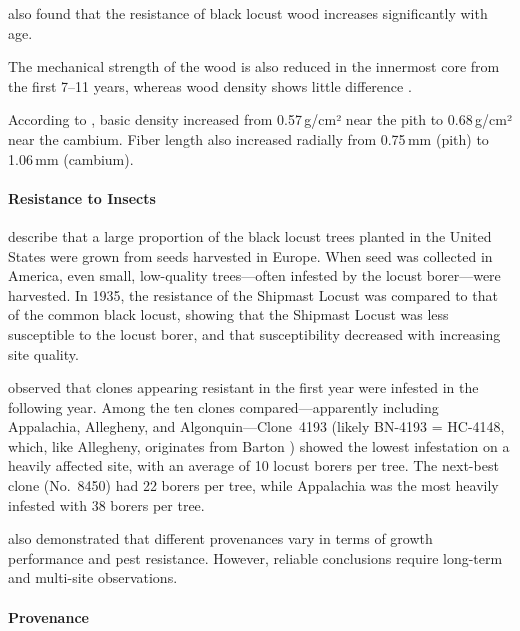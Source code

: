 \citet{szczepkowski2025robinePilze} also found that the resistance of black locust wood increases significantly with age.

The mechanical strength of the wood is also reduced in the innermost core from the first 7–11 years, whereas wood density shows little difference \citep{adamopoulos2007jungesUndAltesRobinienholz,bijak2021robinienholz}.

According to \citet{stringer1987robinieHolzdichte}, basic density increased from 0.57\,g/cm² near the pith to 0.68\,g/cm² near the cambium. Fiber length also increased radially from 0.75\,mm (pith) to 1.06\,mm (cambium).

\paragraph{Resistance to Insects}

\citet{hall1937robinie,cummings1947robinie} describe that a large proportion of the black locust trees planted in the United States were grown from seeds harvested in Europe. When seed was collected in America, even small, low-quality trees—often infested by the locust borer—were harvested. In 1935, the resistance of the Shipmast Locust was compared to that of the common black locust, showing that the Shipmast Locust was less susceptible to the locust borer, and that susceptibility decreased with increasing site quality.

\citet{wollerman1968robinieBorer} observed that clones appearing resistant in the first year were infested in the following year. Among the ten clones compared—apparently including Appalachia, Allegheny, and Algonquin—Clone~4193 (likely BN-4193 = HC-4148, which, like Allegheny, originates from Barton \citep{santamour1960robinie,steinergroup1987robinie}) showed the lowest infestation on a heavily affected site, with an average of 10 locust borers per tree. The next-best clone (No.~8450) had 22 borers per tree, while Appalachia was the most heavily infested with 38 borers per tree.

\citet{genys1990robinie,bridgen1988robinie,mebrahtu1989robinie} also demonstrated that different provenances vary in terms of growth performance and pest resistance. However, reliable conclusions require long-term and multi-site observations.

\paragraph{Provenance}


